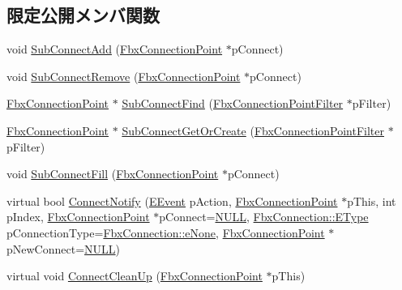\subsection*{限定公開メンバ関数}
\begin{DoxyCompactItemize}
\item 
void \hyperlink{class_fbx_connection_point_a00b7c81a489585571eceabf08890fa86}{Sub\+Connect\+Add} (\hyperlink{class_fbx_connection_point}{Fbx\+Connection\+Point} $\ast$p\+Connect)
\item 
void \hyperlink{class_fbx_connection_point_a3c2464f3030fdbc4978ca8e0333af596}{Sub\+Connect\+Remove} (\hyperlink{class_fbx_connection_point}{Fbx\+Connection\+Point} $\ast$p\+Connect)
\item 
\hyperlink{class_fbx_connection_point}{Fbx\+Connection\+Point} $\ast$ \hyperlink{class_fbx_connection_point_ab17a0982224639d2fe87bcdf8c3c54ea}{Sub\+Connect\+Find} (\hyperlink{class_fbx_connection_point_filter}{Fbx\+Connection\+Point\+Filter} $\ast$p\+Filter)
\item 
\hyperlink{class_fbx_connection_point}{Fbx\+Connection\+Point} $\ast$ \hyperlink{class_fbx_connection_point_a1c31bca2cc4a68c9108ac640bb6e5891}{Sub\+Connect\+Get\+Or\+Create} (\hyperlink{class_fbx_connection_point_filter}{Fbx\+Connection\+Point\+Filter} $\ast$p\+Filter)
\item 
void \hyperlink{class_fbx_connection_point_aaad43b803b8051e8b154bceabdd309a2}{Sub\+Connect\+Fill} (\hyperlink{class_fbx_connection_point}{Fbx\+Connection\+Point} $\ast$p\+Connect)
\item 
virtual bool \hyperlink{class_fbx_connection_point_a67f4175670b447cc8d1362905ad79ac6}{Connect\+Notify} (\hyperlink{class_fbx_connection_point_a48ba0c39363bb20be251626acdc6ae5d}{E\+Event} p\+Action, \hyperlink{class_fbx_connection_point}{Fbx\+Connection\+Point} $\ast$p\+This, int p\+Index, \hyperlink{class_fbx_connection_point}{Fbx\+Connection\+Point} $\ast$p\+Connect=\hyperlink{fbxarch_8h_a070d2ce7b6bb7e5c05602aa8c308d0c4}{N\+U\+LL}, \hyperlink{class_fbx_connection_a3df448a5db356652ab99fd2be2553749}{Fbx\+Connection\+::\+E\+Type} p\+Connection\+Type=\hyperlink{class_fbx_connection_a3df448a5db356652ab99fd2be2553749a47aa04870c3c0769263e3972e67e9ebe}{Fbx\+Connection\+::e\+None}, \hyperlink{class_fbx_connection_point}{Fbx\+Connection\+Point} $\ast$p\+New\+Connect=\hyperlink{fbxarch_8h_a070d2ce7b6bb7e5c05602aa8c308d0c4}{N\+U\+LL})
\item 
virtual void \hyperlink{class_fbx_connection_point_a70d121e5f4200dade54c1f0746f4d540}{Connect\+Clean\+Up} (\hyperlink{class_fbx_connection_point}{Fbx\+Connection\+Point} $\ast$p\+This)

\end{DoxyCompactItemize}
